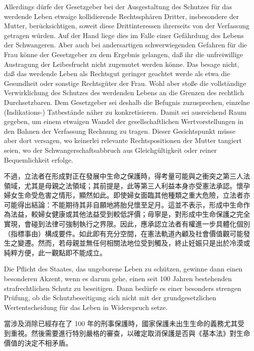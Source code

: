 \documentclass[12pt]{article}
\begin{document}
\syncleft
\begin{sourcepara}
Allerdings dürfe der Gesetzgeber bei der Ausgestaltung des Schutzes für das werdende Leben etwaige kollidierende Rechtssphären Dritter, insbesondere der Mutter, berücksichtigen, soweit diese Drittinteressen ihrerseits von der Verfassung getragen würden. Auf der Hand liege dies im Falle einer Gefährdung des Lebens der Schwangeren. Aber auch bei andersartigen schwerwiegenden Gefahren für die Frau könne der Gesetzgeber zu dem Ergebnis gelangen, daß ihr die unfreiwillige Austragung der Leibesfrucht nicht zugemutet werden könne. Das besage nicht, daß das werdende Leben als Rechtsgut geringer geachtet werde als etwa die Gesundheit oder sonstige Rechtsgüter der Frau. Wohl aber stoße die vollständige Verwirklichung des Schutzes des werdenden Lebens an die Grenzen des rechtlich Durchsetzbaren. Dem Gesetzgeber sei deshalb die Befugnis zuzusprechen, einzelne (Indikations-) Tatbestände näher zu konkretisieren. Damit sei ausreichend Raum gegeben, um einem etwaigen Wandel der gesellschaftlichen Wertvorstellungen in den Bahnen der Verfassung Rechnung zu tragen. Dieser Gesichtspunkt müsse aber dort versagen, wo keinerlei relevante Rechtspositionen der Mutter tangiert seien, wo der Schwangerschaftsabbruch aus Gleichgültigkeit oder reiner Bequemlichkeit erfolge.
\end{sourcepara}
\begin{transpara}
不過，立法者在形成對正在發展中生命之保護時，得考量可能與之衝突之第三人法領域，尤其是母親之法領域；其前提是，此等第三人利益本身亦受憲法承認。懷孕婦女生命受危害之情形，顯然如此。即使婦女面臨其他種類之重大危險，立法者亦可能得出結論：不能期待其非自願地將胎兒懷至足月。這並不表示，形成中生命作為法益，較婦女健康或其他法益受到較低評價；毋寧是，對形成中生命保護之完全實現，會碰到法律可強制執行之界限。因此，應承認立法者有權進一步具體化個別（指標事由）構成要件。如此即有充分空間，在憲法軌道內顧及社會價值觀可能發生之變遷。然而，若母親並無任何相關法地位受到觸及，終止妊娠只是出於冷漠或純粹方便，此一觀點即不能成立。
\end{transpara}

\syncleft
\begin{sourcepara}
Die Pflicht des Staates, das ungeborene Leben zu schützen, gewinne dann einen besonderen Akzent, wenn es darum gehe, einen seit 100 Jahren bestehenden strafrechtlichen Schutz zu beseitigen. Dann bedürfe es einer besonders strengen Prüfung, ob die Schutzbeseitigung sich nicht mit der grundgesetzlichen Wertentscheidung für das Leben in Widerspruch setze.
\end{sourcepara}
\begin{transpara}
當涉及消除已經存在了 100 年的刑事保護時，國家保護未出生生命的義務尤其受到重視。然後需要進行特別嚴格的審查，以確定取消保護是否與《基本法》對生命價值的決定不相矛盾。
\end{transpara}
\end{document}
